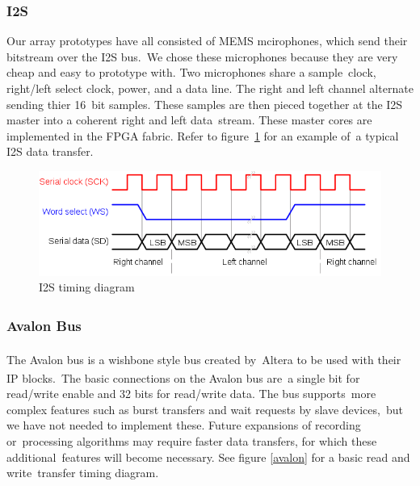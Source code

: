 \documentclass{article}
\begin{document}
\subsubsection{I2S}
Our array prototypes have all consisted of MEMS mcirophones, which send their bitstream over the I2S bus.\
We chose these microphones because they are very cheap and easy to prototype with. Two microphones share a sample\
clock, right/left select clock, power, and a data line. The right and left channel alternate sending thier 16\
bit samples. These samples are then pieced together at the I2S master into a coherent right and left data\
stream. These master cores are implemented in the FPGA fabric. Refer to figure\
\ref{i2s_timing} for an example of\
a typical I2S data transfer.

\begin{figure}[ht]
	\includegraphics[scale=.5]{pictures/i2s_timing.png}
	\centering
	\caption{I2S timing diagram \cite{i2s}}
	\label{i2s_timing}
\end{figure}

\newpage

\subsubsection{Avalon\textsuperscript{\textregistered{}} Bus}
The Avalon\textsuperscript{\textregistered{}} bus is a wishbone style bus created by\
Altera\textsuperscript{\textregistered{}} to be used with their IP blocks.\
The basic connections on the Avalon\textsuperscript{\textregistered{}} bus are\
a single bit for read/write enable and 32 bits for read/write data. The bus supports\
more complex features such as burst transfers and wait requests by slave devices,\
but we have not needed to implement these. Future expansions of recording or\
processing algorithms may require faster data transfers, for which these additional\
features will become necessary.  See figure \ref{avalon} for a basic read and write\
transfer timing diagram.
\end{document}

